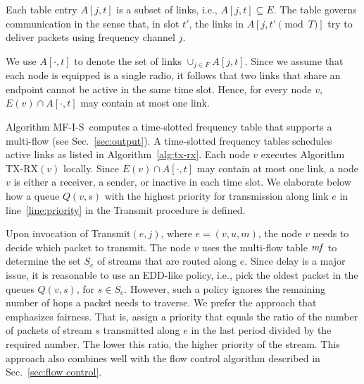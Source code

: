 \documentclass[12pt]{article}
\newenvironment{proof sketch}[1]{\noindent {\emph{Proof sketch of #1:}}}{\hfill \qed}
\newcommand{\mf}{\text{\emph{mf}}}
\newcommand{\algA}{\textsc{MF-I-S}}
\newcommand{\Alg}{\algA}
\begin{document}
Each table entry $A[j,t]$ is a subset of links,
i.e., $A[j,t]\subseteq E$.  The table governs communication in the
sense that, in slot $t'$, the links in $A[j,t' \pmod T]$ try to deliver packets
using frequency channel $j$.

We use $A[\cdot,t]$ to denote the set of links $\cup_{j\in F}
A[j,t]$.  Since we assume that each node is equipped is a single
radio, it follows that two links that share an endpoint cannot be
active in the same time slot.  Hence, for every node $v$, $E(v) \cap
A[\cdot ,t]$ may contain at most one link.

Algorithm \Alg\ computes a time-slotted frequency table that supports
a multi-flow (see Sec.~\ref{sec:output}). A time-slotted frequency
tables schedules active links as listed in Algorithm~\ref{alg:tx-rx}.
Each node $v$ executes Algorithm TX-RX$(v)$ locally.  Since $E(v) \cap
A[\cdot ,t]$ may contain at most one link, a node $v$ is either a
receiver, a sender, or inactive in each time slot.  We elaborate below how
a queue $Q(v,s)$ with the highest priority for transmission along link
$e$ in line~\ref{line:priority} in the Transmit procedure is defined.

Upon invocation of Transmit$(e,j)$, where $e=(v,u,m)$, the node $v$
needs to decide which packet to transmit. The node $v$ uses the
multi-flow table $\mf$ to determine the set $S_e$ of streams that are
routed along $e$.  Since delay is a major issue, it is reasonable to
use an EDD-like policy, i.e., pick the oldest packet in the queues
$Q(v,s)$, for $s\in S_e$.  However, such a policy ignores the
remaining number of hops a packet needs to traverse. We prefer the
approach that emphasizes fairness. That is, assign a priority that
equals the ratio of the number of packets of stream $s$ transmitted
along $e$ in the last period divided by the required number. The lower
this ratio, the higher priority of the stream. This approach also
combines well with the flow control algorithm described in
Sec.~\ref{sec:flow control}.
\end{document}
